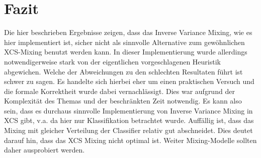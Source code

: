 \documentclass[10pt]{ocsmnar}
\begin{document}
\section{Fazit}
Die hier beschrieben Ergebnisse zeigen, dass das Inverse Variance Mixing, wie es hier implementiert ist, sicher nicht als sinnvolle Alternative zum gewöhnlichen XCS-Mixing benutzt werden kann. In dieser Implementierung wurde allerdings notwendigerweise stark von der eigentlichen vorgeschlagenen Heuristik abgewichen. Welche der Abweichungen zu den schlechten Resultaten führt ist schwer zu sagen. 
Es handelte sich hierbei eher um einen praktischen Versuch und die formale Korrektheit wurde dabei vernachlässigt. Dies war aufgrund der Komplexität des Themas und der beschränkten Zeit notwendig. Es kann also sein, dass es durchaus sinnvolle Implementierung von Inverse Variance Mixing in XCS gibt, v.a. da hier nur Klassifikation betrachtet wurde. 
Auffällig ist, dass das Mixing mit gleicher Verteilung der Classifier relativ gut abschneidet. Dies deutet darauf hin, dass das XCS Mixing nicht optimal ist. Weiter Mixing-Modelle sollten daher ausprobiert werden.  





\end{document}
